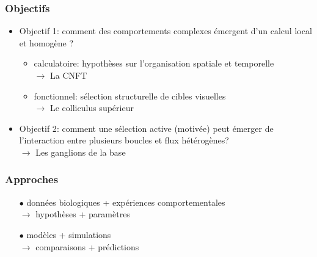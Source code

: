 \documentclass[10pt]{beamer}
\begin{document}
\begin{frame}
  \frametitle{Objectifs}
\begin{itemize}
\item<1->  {\color {blue}Objectif 1}: {\color {myblue}comment des comportements complexes \'emergent d'un calcul local et homog\`ene ?}
\begin{itemize}
\item<2-> calculatoire: hypoth\`eses sur l'organisation spatiale et temporelle\\
$\to$ La CNFT
\item<3->  fonctionnel: s\'election structurelle de cibles visuelles\\
$\to$ Le colliculus sup\'erieur
\end{itemize}
\item<4-> {\color {blue}Objectif 2}: {\color {myblue}comment une s\'election active (motiv\'ee) peut \'emerger de l'interaction entre plusieurs boucles et flux h\'et\'erog\`enes?} \\
$\to$  Les ganglions de la base
\end{itemize}
\end{frame}


\begin{frame}
  \frametitle{Approches}
\begin{itemize}

\item[$\bullet$] donn\'ees biologiques + exp\'eriences comportementales \\{\em {\color {blue} $\to$}} hypoth\`eses + param\`etres 
\item[$\bullet$] mod\`eles + simulations \\{\em {\color {blue} $\to$}} comparaisons + pr\'edictions

\end{itemize}
\begin{center}

\end{center}

\end{frame}
\end{document}
